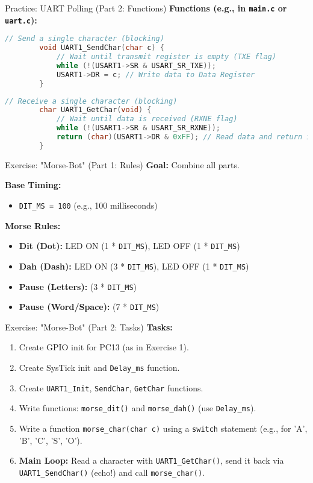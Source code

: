 \documentclass{beamer}
\begin{document}
\begin{frame}[fragile]{Practice: UART Polling (Part 2: Functions)}
	\textbf{Functions (e.g., in \texttt{main.c} or \texttt{uart.c}):}
	\begin{lstlisting}[language=C, style=mystyle]
		// Send a single character (blocking)
		void UART1_SendChar(char c) {
			// Wait until transmit register is empty (TXE flag)
			while (!(USART1->SR & USART_SR_TXE)); 
			USART1->DR = c; // Write data to Data Register
		}
	\end{lstlisting}
	
	\begin{lstlisting}[language=C, style=mystyle]
		// Receive a single character (blocking)
		char UART1_GetChar(void) {
			// Wait until data is received (RXNE flag)
			while (!(USART1->SR & USART_SR_RXNE));
			return (char)(USART1->DR & 0xFF); // Read data and return it
		}
	\end{lstlisting}
\end{frame}

\begin{frame}{Exercise: "Morse-Bot" (Part 1: Rules)}
	\textbf{Goal:} Combine all parts.
	
	\medskip
	\textbf{Base Timing:}
	\begin{itemize}
		\item \texttt{DIT\_MS = 100} (e.g., 100 milliseconds)
	\end{itemize}
	
	\textbf{Morse Rules:}
	\begin{itemize}
		\item \textbf{Dit (Dot):} LED ON (1 * \texttt{DIT\_MS}), LED OFF (1 * \texttt{DIT\_MS})
		\item \textbf{Dah (Dash):} LED ON (3 * \texttt{DIT\_MS}), LED OFF (1 * \texttt{DIT\_MS})
		\item \textbf{Pause (Letters):} (3 * \texttt{DIT\_MS})
		\item \textbf{Pause (Word/Space):} (7 * \texttt{DIT\_MS})
	\end{itemize}
\end{frame}

\begin{frame}{Exercise: "Morse-Bot" (Part 2: Tasks)}
	\textbf{Tasks:}
	\begin{enumerate}
		\item Create GPIO init for PC13 (as in Exercise 1).
		\item Create SysTick init and \texttt{Delay\_ms} function.
		\item Create \texttt{UART1\_Init}, \texttt{SendChar}, \texttt{GetChar} functions.
		\item Write functions: \texttt{morse\_dit()} and \texttt{morse\_dah()} (use \texttt{Delay\_ms}).
		\item Write a function \texttt{morse\_char(char c)} using a \texttt{switch} statement (e.g., for 'A', 'B', 'C', 'S', 'O').
		\item \textbf{Main Loop:} Read a character with \texttt{UART1\_GetChar()}, send it back via \texttt{UART1\_SendChar()} (echo!) and call \texttt{morse\_char()}.
	\end{enumerate}
\end{frame}
\end{document}
